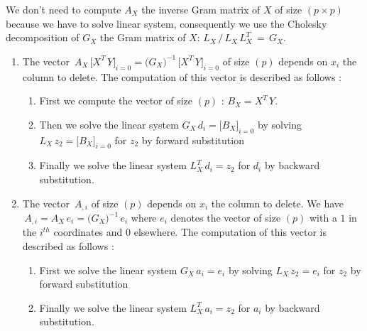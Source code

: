 We don't need to compute $A_X$ the inverse Gram matrix of $X$ of size $(p\times p)$ because we have to solve linear system, consequently
we use the Cholesky decomposition of $G_X$ the Gram matrix of $X$: $L_X  \,/\, L_X\,L_X^T\,=\,G_X$.
\begin{enumerate}
\item The vector $\,A_X\,\big[X^T\,Y\big]_{i=0}=\big(G_X\big)^{-1}\,\big[X^T\,Y\big]_{i=0}$ of size $(p)$ depends on $x_i$ the column to delete.
The computation of this vector is described as follows :
\begin{enumerate}
\item First we compute the vector of size $(p)$ : $B_X=X^T\,Y$.
\item Then we solve the linear system $G_X \,d_i= \big[B_X\big]_{i=0}$ by solving $L_X\,z_2= \big[B_X\big]_{i=0}$ for $z_2$ by forward substitution
\item Finally we solve the linear system $L_X^T\,d_i=z_2$ for $d_i$ by backward substitution.
\end{enumerate}
\item The vector $\,A_{,i}$ of size $(p)$ depends on $x_i$ the column to delete.
We have $\,A_{,i}=A_X \, e_i=\big(G_X\big)^{-1}\,e_i$  where $e_i$ denotes the vector of size $(p)$ with a $1$ in the $i^{th}$ coordinates and $0$ elsewhere.
The computation of this vector is described as follows :
\begin{enumerate}
\item First we solve the linear system $G_X \,a_i= e_i$ by solving $L_X\,z_2= e_i$ for $z_2$ by forward substitution
\item Finally we solve the linear system $L_X^T\,a_i=z_2$ for $a_i$ by backward substitution.
\end{enumerate}
\end{enumerate}


\newpage
